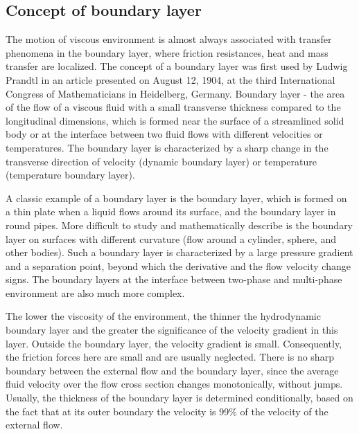 \subsection{Concept of boundary layer}
	The motion of viscous environment is almost always associated with transfer phenomena in the boundary layer, where friction resistances, heat and mass transfer are localized. The concept of a boundary layer was first used by Ludwig Prandtl in an article presented on August 12, 1904, at the third International Congress of Mathematicians in Heidelberg, Germany. Boundary layer - the area of the flow of a viscous fluid with a small transverse thickness compared to the longitudinal dimensions, which is formed near the surface of a streamlined solid body or at the interface between two fluid flows with different velocities or temperatures. The boundary layer is characterized by a sharp change in the transverse direction of velocity (dynamic boundary layer) or temperature (temperature boundary layer).
	
	A classic example of a boundary layer is the boundary layer, which is formed on a thin plate when a liquid flows around its surface, and the boundary layer in round pipes. More difficult to study and mathematically describe is the boundary layer on surfaces with different curvature (flow around a cylinder, sphere, and other bodies). Such a boundary layer is characterized by a large pressure gradient and a separation point, beyond which the derivative and the flow velocity change signs. The boundary layers at the interface between two-phase and multi-phase environment are also much more complex.
	
	The lower the viscosity of the environment, the thinner the hydrodynamic boundary layer and the greater the significance of the velocity gradient in this layer. Outside the boundary layer, the velocity gradient is small. Consequently, the friction forces here are small and are usually neglected. There is no sharp boundary between the external flow and the boundary layer, since the average fluid velocity over the flow cross section changes monotonically, without jumps. Usually, the thickness of the boundary layer is determined conditionally, based on the fact that at its outer boundary the velocity is 99\% of the velocity of the external flow.
	
